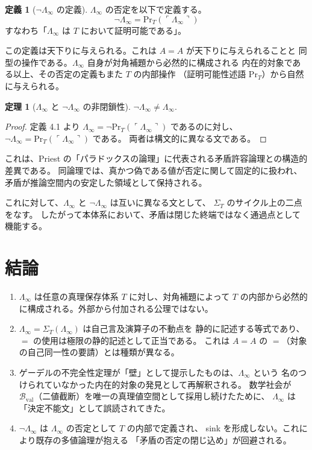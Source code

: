 \documentclass[11pt,a4paper]{ltjsarticle}
\theoremstyle{definition}
\newtheorem{definition}{定義}[section]
\newtheorem{theorem}{定理}[section]
\newcommand{\LawvereInfinity}{\Lambda_\infty}
\newcommand{\SelfRef}{\Sigma}
\newcommand{\Bval}{\mathcal{B}_{\mathrm{val}}}
\renewcommand{\Pr}{\mathrm{Pr}}
\begin{document}
\begin{definition}[$\neg \LawvereInfinity$ の定義]
$\LawvereInfinity$ の否定を以下で定義する。
$$\neg \LawvereInfinity = \Pr_T(\ulcorner \LawvereInfinity \urcorner)$$
すなわち「$\LawvereInfinity$ は $T$ において証明可能である」。

この定義は天下りに与えられる。これは $A = A$ が天下りに与えられることと
同型の操作である。$\LawvereInfinity$ 自身が対角補題から必然的に構成される
内在的対象である以上、その否定の定義もまた $T$ の内部操作
（証明可能性述語 $\Pr_T$）から自然に与えられる。
\end{definition}

\begin{theorem}[$\LawvereInfinity$ と $\neg \LawvereInfinity$ の非閉鎖性]
$\neg \LawvereInfinity \neq \LawvereInfinity$.
\end{theorem}

\begin{proof}
定義 4.1 より $\LawvereInfinity = \neg \Pr_T(\ulcorner \LawvereInfinity \urcorner)$ であるのに対し、
$\neg \LawvereInfinity = \Pr_T(\ulcorner \LawvereInfinity \urcorner)$ である。
両者は構文的に異なる文である。
\end{proof}

これは、Priest の「パラドックスの論理」に代表される矛盾許容論理との構造的差異である\cite{Priest1979}。
同論理では、真かつ偽である値が否定に関して固定的に扱われ、
矛盾が推論空間内の安定した領域として保持される。

これに対して、$\LawvereInfinity$ と $\neg \LawvereInfinity$ は互いに異なる文として、
$\SelfRef_T$ のサイクル上の二点をなす。
したがって本体系において、矛盾は閉じた終端ではなく通過点として機能する。

\section{結論}

\begin{enumerate}[label=(\arabic*)]
    \item $\LawvereInfinity$ は任意の真理保存体系 $T$ に対し、対角補題によって
          $T$ の内部から必然的に構成される。外部から付加される公理ではない。
    \item $\LawvereInfinity = \SelfRef_T(\LawvereInfinity)$ は自己言及演算子の不動点を
          静的に記述する等式であり、$=$ の使用は極限の静的記述として正当である。
          これは $A = A$ の $=$（対象の自己同一性の要請）とは種類が異なる。
    \item ゲーデルの不完全性定理が「壁」として提示したものは、$\LawvereInfinity$ という
          名のつけられていなかった内在的対象の発見として再解釈される。
          数学社会が $\Bval$（二値截断）を唯一の真理値空間として採用し続けたために、
          $\LawvereInfinity$ は「決定不能文」として誤読されてきた。
    \item $\neg \LawvereInfinity$ は $\LawvereInfinity$ の否定として $T$ の内部で定義され、
          sink を形成しない。これにより既存の多値論理が抱える
          「矛盾の否定の閉じ込め」が回避される。
\end{enumerate}
\end{document}
